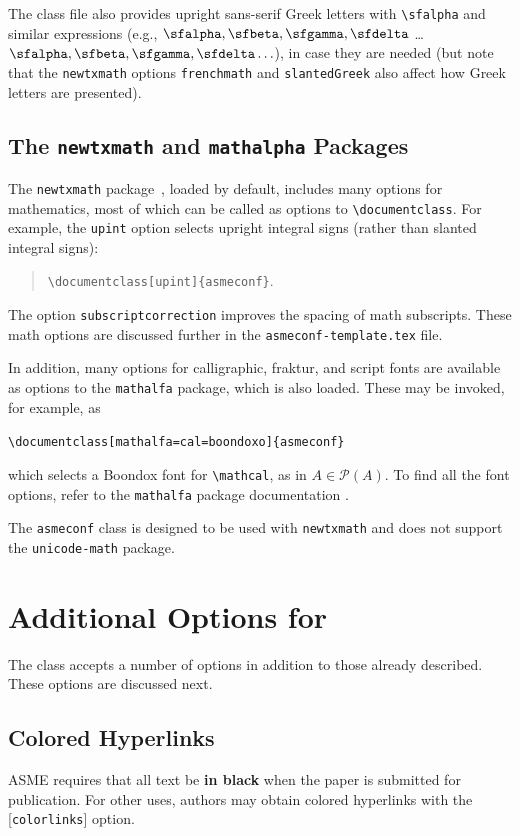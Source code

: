\documentclass[captionpatch,colorlinks,upint,subscriptcorrection,varvw,mathalfa=cal=boondoxo,german]{asmeconf}
\begin{document}
The class file also provides upright sans-serif Greek letters with \verb|\sfalpha| and similar expressions (e.g., $\sfalpha, \sfbeta, \sfgamma, \sfdelta$ \ldots $\bm{\sfalpha, \sfbeta, \sfgamma, \sfdelta \ldots}$), in case they are needed (but note that the \verb|newtxmath| options \verb|frenchmath| and \verb|slantedGreek| also affect how Greek letters are presented).

\subsection{The \texttt{newtxmath} and \texttt{mathalpha} Packages~\cite{sharpe1,sharpe2}} The \texttt{newtxmath} package~\cite{sharpe1}, loaded by default, includes many options for mathematics, most of which can be called as options to \verb|\documentclass|. For example, the \texttt{upint} option selects upright integral signs (rather than slanted integral signs):
\begin{quote}
\verb|\documentclass[upint]{asmeconf}|. 
\end{quote}  
The option \verb|subscriptcorrection| improves the spacing of math subscripts. These math options are discussed further in the \texttt{asmeconf-template.tex} file. 

In addition, many options for calligraphic, fraktur, and script fonts are available as options to the \texttt{mathalfa} package, which is also loaded. These may be invoked, for example, as 
\begin{center}
\verb|\documentclass[mathalfa=cal=boondoxo]{asmeconf}| 
\end{center}
which selects a Boondox font for \verb|\mathcal|, as in $A \in \mathcal{P}(A)$. To find all the font options, refer to the \texttt{mathalfa} package documentation \cite{sharpe2}.

The \texttt{asmeconf} class is designed to be used with \texttt{newtxmath} and does not support the \texttt{unicode-math} package.



\section{Additional Options for }
The class accepts a number of options in addition to those already described. These options are discussed next.

\subsection{Colored Hyperlinks}
ASME requires that all text be \textbf{in black} when the paper is submitted for publication.  For other uses, authors may
obtain colored hyperlinks with the [\texttt{colorlinks}] option.
\end{document}
